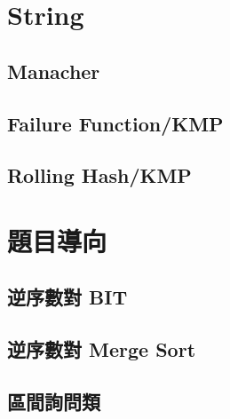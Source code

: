 \section{String}
	\subsection{Manacher}
		
	\subsection{Failure Function/KMP}
		
	\subsection{Rolling Hash/KMP}
		
\section{題目導向}
	\subsection{逆序數對 BIT}
		
	\subsection{逆序數對 Merge Sort}
		
	\subsection{區間詢問類}
		
